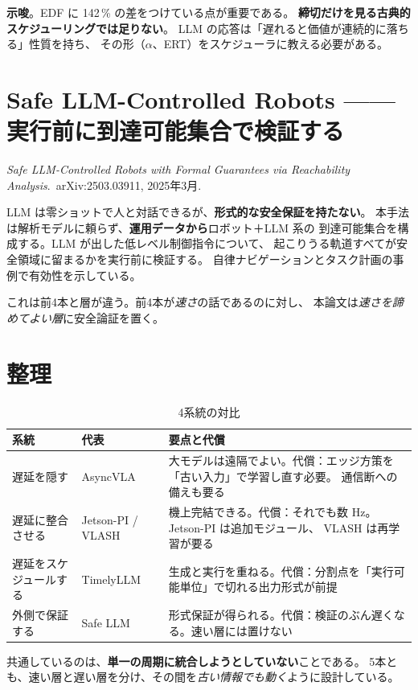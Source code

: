 \documentclass[11pt,a4paper]{article}
\newcommand{\prob}[1]{\textbf{\textcolor{red!55!black}{#1}}}
\newcommand{\keyp}[1]{\textbf{\textcolor{blue!45!black}{#1}}}
\begin{document}
\keyp{示唆}。EDF に 142\,\% の差をつけている点が重要である。
\prob{締切だけを見る古典的スケジューリングでは足りない}。
LLM の応答は「遅れると価値が連続的に落ちる」性質を持ち、
その形（$\alpha$、ERT）をスケジューラに教える必要がある。

\section{Safe LLM-Controlled Robots —— 実行前に到達可能集合で検証する}

\noindent
\emph{Safe LLM-Controlled Robots with Formal Guarantees via Reachability Analysis}.\
arXiv:2503.03911, 2025年3月.

LLM は零ショットで人と対話できるが、\prob{形式的な安全保証を持たない}。
本手法は解析モデルに頼らず、\keyp{運用データから}ロボット＋LLM 系の
到達可能集合を構成する。LLM が出した低レベル制御指令について、
起こりうる軌道すべてが安全領域に留まるかを実行前に検証する。
自律ナビゲーションとタスク計画の事例で有効性を示している。

これは前4本と層が違う。前4本が\emph{速さ}の話であるのに対し、
本論文は\emph{速さを諦めてよい層}に安全論証を置く。

\section{整理}

\begin{table}[htbp]
\centering
\small
\caption{4系統の対比}
\begin{tabularx}{\textwidth}{@{}l l X@{}}
\toprule
\textbf{系統} & \textbf{代表} & \textbf{要点と代償} \\
\midrule
遅延を隠す & AsyncVLA
  & 大モデルは遠隔でよい。代償：エッジ方策を「古い入力」で学習し直す必要。
    通信断への備えも要る \\
遅延に整合させる & Jetson-PI / VLASH
  & 機上完結できる。代償：それでも数 Hz。Jetson-PI は追加モジュール、
    VLASH は再学習が要る \\
遅延をスケジュールする & TimelyLLM
  & 生成と実行を重ねる。代償：分割点を「実行可能単位」で切れる出力形式が前提 \\
外側で保証する & Safe LLM
  & 形式保証が得られる。代償：検証のぶん遅くなる。速い層には置けない \\
\bottomrule
\end{tabularx}
\end{table}

\noindent
共通しているのは、\keyp{単一の周期に統合しようとしていない}ことである。
5本とも、速い層と遅い層を分け、その間を\emph{古い情報でも動く}ように設計している。
\end{document}
